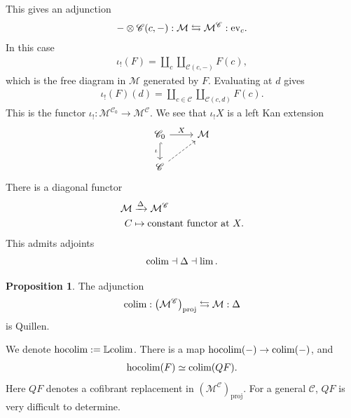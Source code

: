 \documentclass[12pt]{amsart}
\theoremstyle{definition}
\newtheorem{proposition}[theorem]{Proposition}
\begin{document}
This gives an adjunction
\begin{align*}
    - \otimes \mathscr{C}(c,-) : \mathcal{M} \leftrightarrows \mathcal{M}^{\mathscr{C}}: \text{ev}_c.
\end{align*}
In this case
\begin{align*}
    \iota_!(F) = \amalg_c \amalg_{\mathscr{C}(c,-)} F(c),
\end{align*}
which is the free diagram in $\mathcal{M}$ generated by $F$. Evaluating at $d$ gives
\begin{align*}
    \iota_!(F)(d) = \amalg_{c\in \mathscr{C}} \amalg_{\mathscr{C}(c,d)} F(c).
\end{align*}
This is the functor $\iota_! : \mathcal{M}^{\mathscr{C}_0} \to \mathcal{M}^{\mathscr{C}}$.
We see that $\iota_! X$ is a left Kan extension
\[ \begin{tikzcd}
    \mathscr{C}_0\dar[hook,"\iota" left]\rar["X"] & \mathcal{M}\\
    \mathscr{C}\ar[ur,dashed] & 
\end{tikzcd} \]
There is a diagonal functor
\begin{align*}
    \mathcal{M} &\xrightarrow{\Delta} \mathcal{M}^{\mathscr{C}} \\
    C &\mapsto \text{constant functor at }X.
\end{align*}
This admits adjoints
\begin{align*}
    \text{colim} \dashv \Delta \dashv \lim.
\end{align*}

\begin{proposition} The adjunction
\begin{align*}
    \text{colim}:\left( \mathcal{M}^{\mathscr{C}} \right)_\text{proj} \leftrightarrows \mathcal{M}: \Delta
\end{align*}
is Quillen.
\end{proposition}
We denote $\text{hocolim} := \mathbb{L} \text{colim}$. There is a map $\text{hocolim}(-) \to \text{colim}(-)$, and
\begin{align*}
    \text{hocolim}(F) \simeq \text{colim}(QF).
\end{align*}
Here $QF$ denotes a cofibrant replacement in $\left( \mathcal{M}^{\mathscr{C}} \right)_\text{proj}$. For a general $\mathscr{C}$, $QF$ is very difficult to determine.
\end{document}
